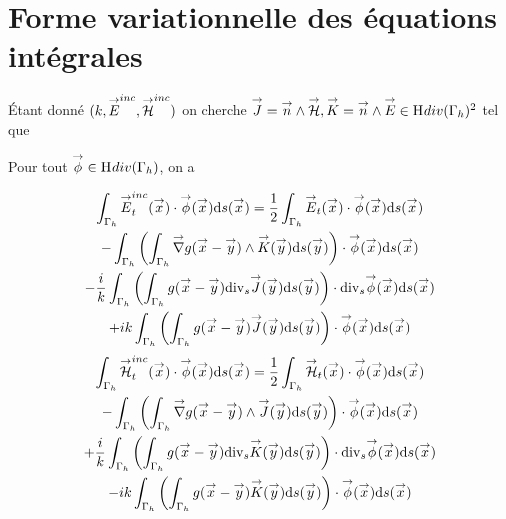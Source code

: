 


\section{Forme variationnelle des équations intégrales}
  Étant donné \((k,{\overset{\rightarrow}{E}}^{inc},{\overset{\rightarrow}{\mathcal{H}}}^{inc})\) on cherche \({\overset{\rightarrow}{J}} = {\overset{\rightarrow}{n}} \wedge {\overset{\rightarrow}{\mathcal{H}}}, {\overset{\rightarrow}{K}} = {\overset{\rightarrow}{n}} \wedge {\overset{\rightarrow}{E}} \in \mathrm{H}_\mathrm{{}}{div}(\Gamma_h)^2\)  tel que

  Pour tout \({\overset{\rightarrow}{\phi}} \in \mathrm{H}_\mathrm{{}}{div}(\Gamma_h)\), on a

  \begin{multline}
    \label{eq:form_int:EFIE:var}
    \int_{\Gamma_h} \vE^{inc}_t(\vx) \cdot \vect{\phi}(\vx) \dd{s}(\vx) =
      \frac{1}{2} \int_{\Gamma_h} \vE_t(\vx) \cdot \vect{\phi}(\vx) \dd{s}(\vx) \\
        - \int_{\Gamma_h} \left( \int_{\Gamma_h} \vgrad g(\vx - \vy) \pvect \vK(\vy) \dd{s}(\vy) \right) \cdot \vect{\phi}(\vx) \dd{s}(\vx) \\
      - \frac{i}{k} \int_{\Gamma_h} \left( \int_{\Gamma_h}  g(\vx - \vy)\tdivs\vJ(\vy) \dd{s}(\vy) \right) \cdot \tdivs \vect{\phi}(\vx) \dd{s}(\vx) \\
        +  ik\int_{\Gamma_h} \left( \int_{\Gamma_h} g(\vx - \vy)\vJ(\vy) \dd{s}(\vy) \right) \cdot \vect{\phi}(\vx) \dd{s}(\vx)
  \end{multline}
  \begin{multline}
    \label{eq:form_int:MFIE:var}
    \int_{\Gamma_h} \vH^{inc}_t(\vx) \cdot \vect{\phi}(\vx) \dd{s}(\vx) =
      \frac{1}{2} \int_{\Gamma_h} \vH_t(\vx) \cdot \vect{\phi}(\vx) \dd{s}(\vx) \\
        - \int_{\Gamma_h} \left( \int_{\Gamma_h} \vgrad g(\vx - \vy) \pvect \vJ(\vy) \dd{s}(\vy) \right) \cdot \vect{\phi}(\vx) \dd{s}(\vx) \\
      + \frac{i}{k} \int_{\Gamma_h} \left( \int_{\Gamma_h}  g(\vx - \vy)\tdivs\vK(\vy) \dd{s}(\vy) \right) \cdot \tdivs \vect{\phi}(\vx) \dd{s}(\vx) \\
        -  ik\int_{\Gamma_h} \left( \int_{\Gamma_h} g(\vx - \vy)\vK(\vy) \dd{s}(\vy) \right) \cdot \vect{\phi}(\vx) \dd{s}(\vx)
  \end{multline}

